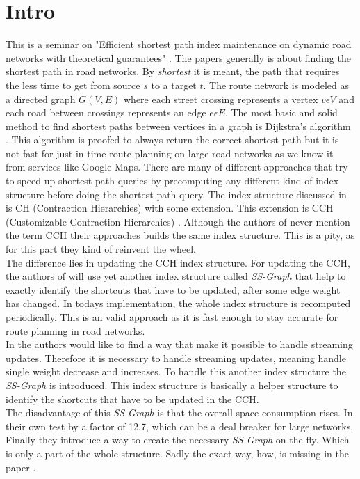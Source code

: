 \documentclass[twocolumn]{article}
\begin{document}


\section{Intro}

This is a seminar on "Efficient shortest path index maintenance on dynamic
road networks with theoretical guarantees" \cite{Ouyang2020}. The papers generally is
about finding the shortest path in road networks. By \textit{shortest} it is meant,
the path that requires the less time to get from source $s$ to a target $t$. The route
network is modeled as a directed graph $G(V,E)$ where each street crossing represents a
vertex $v \epsilon V$ and each road between crossings represents an edge $e \epsilon E$.
The most basic and solid method to find shortest paths between vertices in a graph is
Dijkstra's algorithm \cite{Dijkstra1959}. This algorithm is proofed to always return the
correct shortest path but it is not fast for just in time route planning on large
road networks as we know it from services like Google Maps. There are many of
different approaches that try to speed up shortest path queries by precomputing 
any different kind of index structure before doing the shortest path query. The index 
structure discussed in \cite{Ouyang2020} is CH (Contraction Hierarchies)\cite{Geisberger}
with some extension. This extension is CCH (Customizable Contraction Hierarchies) 
\cite{Dibbelt2014}. Although the authors of \cite{Ouyang2020} never mention the term
CCH their approaches builds the same index structure. This is a pity, as for this part 
they kind of reinvent the wheel. 
\\
The difference lies in updating 
the CCH index structure. For updating the CCH, the authors of \cite{Ouyang2020} will use yet another
index structure called \textit{SS-Graph} that help to exactly identify the shortcuts that
have to be updated, after some edge weight has changed. In todays implementation, the whole
index structure is recomputed periodically. This is an valid approach as it is fast enough 
to stay accurate for route planning in road networks.
\\
In \cite{Ouyang2020} the authors would like to find a way that make it possible to handle streaming
updates. Therefore it is necessary to handle streaming updates, meaning handle single weight decrease
and increases. To handle this another index structure the \textit{SS-Graph} is introduced.
This index structure is basically a helper structure to identify the shortcuts
that have to be updated in the CCH. 
\\
The disadvantage of this \textit{SS-Graph} is that the overall space consumption rises.
In their own test by a factor of 12.7, which can be a deal breaker for large networks.
Finally they introduce a way to create the necessary \textit{SS-Graph} on the fly. Which 
is only a part of the whole structure. 
Sadly the exact way, how, is missing in the paper \cite{Ouyang2020}.


\newpage


\end{document}
